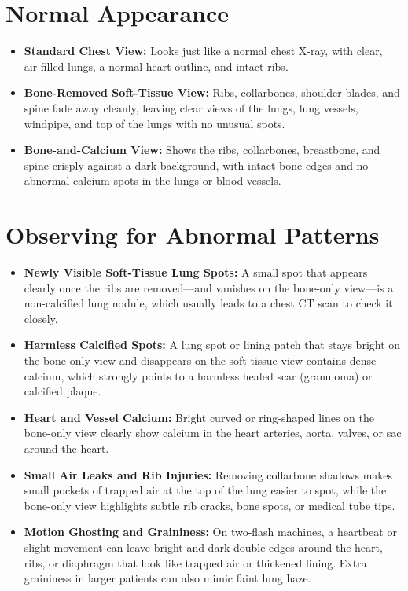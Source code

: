 \section{Normal Appearance}
\begin{itemize}
    \item \textbf{Standard Chest View:} Looks just like a normal chest X-ray, with clear, air-filled lungs, a normal heart outline, and intact ribs.
    \item \textbf{Bone-Removed Soft-Tissue View:} Ribs, collarbones, shoulder blades, and spine fade away cleanly, leaving clear views of the lungs, lung vessels, windpipe, and top of the lungs with no unusual spots.
    \item \textbf{Bone-and-Calcium View:} Shows the ribs, collarbones, breastbone, and spine crisply against a dark background, with intact bone edges and no abnormal calcium spots in the lungs or blood vessels.
\end{itemize}

\section{Observing for Abnormal Patterns}
\begin{itemize}
    \item \textbf{Newly Visible Soft-Tissue Lung Spots:} A small spot that appears clearly once the ribs are removed---and vanishes on the bone-only view---is a non-calcified lung nodule, which usually leads to a chest CT scan to check it closely.
    \item \textbf{Harmless Calcified Spots:} A lung spot or lining patch that stays bright on the bone-only view and disappears on the soft-tissue view contains dense calcium, which strongly points to a harmless healed scar (granuloma) or calcified plaque.
    \item \textbf{Heart and Vessel Calcium:} Bright curved or ring-shaped lines on the bone-only view clearly show calcium in the heart arteries, aorta, valves, or sac around the heart.
    \item \textbf{Small Air Leaks and Rib Injuries:} Removing collarbone shadows makes small pockets of trapped air at the top of the lung easier to spot, while the bone-only view highlights subtle rib cracks, bone spots, or medical tube tips.
    \item \textbf{Motion Ghosting and Graininess:} On two-flash machines, a heartbeat or slight movement can leave bright-and-dark double edges around the heart, ribs, or diaphragm that look like trapped air or thickened lining. Extra graininess in larger patients can also mimic faint lung haze.
\end{itemize}

